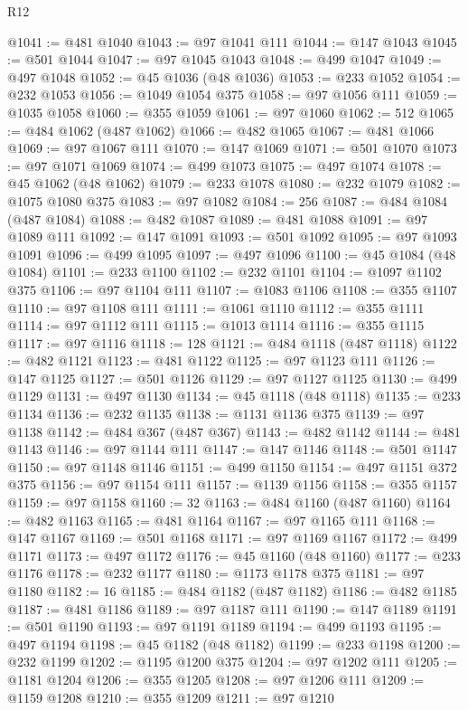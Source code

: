 \begin{lexlean}{R12}
\begin{coremodule}
{{{{{{{{{{{{{{{{{{{{{{{{{{{{{{{{{{{{{{{{{{{{{{{{{{{{{{{{{{{{{{{{{{{{{{{{{{{{{{{{{{@1041 := @481 @1040
@1043 := @97 @1041 @111
@1044 := @147 @1043
@1045 := @501 @1044
@1047 := @97 @1045 @1043
@1048 := @499 @1047
@1049 := @497 @1048
@1052 := @45 @1036 (@48 @1036)
@1053 := @233 @1052
@1054 := @232 @1053
@1056 := @1049 @1054 @375
@1058 := @97 @1056 @111
@1059 := @1035 @1058
@1060 := @355 @1059
@1061 := @97 @1060
@1062 := 512
@1065 := @484 @1062 (@487 @1062)
@1066 := @482 @1065
@1067 := @481 @1066
@1069 := @97 @1067 @111
@1070 := @147 @1069
@1071 := @501 @1070
@1073 := @97 @1071 @1069
@1074 := @499 @1073
@1075 := @497 @1074
@1078 := @45 @1062 (@48 @1062)
@1079 := @233 @1078
@1080 := @232 @1079
@1082 := @1075 @1080 @375
@1083 := @97 @1082
@1084 := 256
@1087 := @484 @1084 (@487 @1084)
@1088 := @482 @1087
@1089 := @481 @1088
@1091 := @97 @1089 @111
@1092 := @147 @1091
@1093 := @501 @1092
@1095 := @97 @1093 @1091
@1096 := @499 @1095
@1097 := @497 @1096
@1100 := @45 @1084 (@48 @1084)
@1101 := @233 @1100
@1102 := @232 @1101
@1104 := @1097 @1102 @375
@1106 := @97 @1104 @111
@1107 := @1083 @1106
@1108 := @355 @1107
@1110 := @97 @1108 @111
@1111 := @1061 @1110
@1112 := @355 @1111
@1114 := @97 @1112 @111
@1115 := @1013 @1114
@1116 := @355 @1115
@1117 := @97 @1116
@1118 := 128
@1121 := @484 @1118 (@487 @1118)
@1122 := @482 @1121
@1123 := @481 @1122
@1125 := @97 @1123 @111
@1126 := @147 @1125
@1127 := @501 @1126
@1129 := @97 @1127 @1125
@1130 := @499 @1129
@1131 := @497 @1130
@1134 := @45 @1118 (@48 @1118)
@1135 := @233 @1134
@1136 := @232 @1135
@1138 := @1131 @1136 @375
@1139 := @97 @1138
@1142 := @484 @367 (@487 @367)
@1143 := @482 @1142
@1144 := @481 @1143
@1146 := @97 @1144 @111
@1147 := @147 @1146
@1148 := @501 @1147
@1150 := @97 @1148 @1146
@1151 := @499 @1150
@1154 := @497 @1151 @372 @375
@1156 := @97 @1154 @111
@1157 := @1139 @1156
@1158 := @355 @1157
@1159 := @97 @1158
@1160 := 32
@1163 := @484 @1160 (@487 @1160)
@1164 := @482 @1163
@1165 := @481 @1164
@1167 := @97 @1165 @111
@1168 := @147 @1167
@1169 := @501 @1168
@1171 := @97 @1169 @1167
@1172 := @499 @1171
@1173 := @497 @1172
@1176 := @45 @1160 (@48 @1160)
@1177 := @233 @1176
@1178 := @232 @1177
@1180 := @1173 @1178 @375
@1181 := @97 @1180
@1182 := 16
@1185 := @484 @1182 (@487 @1182)
@1186 := @482 @1185
@1187 := @481 @1186
@1189 := @97 @1187 @111
@1190 := @147 @1189
@1191 := @501 @1190
@1193 := @97 @1191 @1189
@1194 := @499 @1193
@1195 := @497 @1194
@1198 := @45 @1182 (@48 @1182)
@1199 := @233 @1198
@1200 := @232 @1199
@1202 := @1195 @1200 @375
@1204 := @97 @1202 @111
@1205 := @1181 @1204
@1206 := @355 @1205
@1208 := @97 @1206 @111
@1209 := @1159 @1208
@1210 := @355 @1209
@1211 := @97 @1210
}}}}}}}}}}}}}}}}}}}}}}}}}}}}}}}}}}}}}}}}}}}}}}}}}}}}}}}}}}}}}}}}}}}}}}}}}}}}}}}}}}
\end{coremodule}
\end{lexlean}
